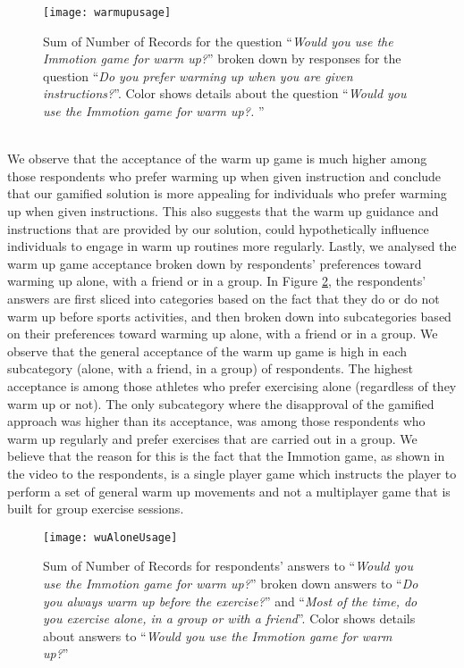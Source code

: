 \begin{figure}[h]
    \centering
    \texttt{[image: warmupusage]}
    \caption{Sum of Number of Records for the question ``\textit{Would you use the Immotion game for warm up?}'' broken down by responses for the question ``\textit{Do you prefer warming up when you are given instructions?}''. Color shows details about the question ``\textit{Would you use the Immotion game for warm up?. }''}
    \label{fig:warmupusage}
\end{figure}\\
We observe that the acceptance of the warm up game is much higher among those respondents who prefer warming up when given instruction and conclude that our gamified solution is more appealing for individuals who prefer warming up when given instructions. This also suggests that the warm up guidance and instructions that are provided by our solution, could hypothetically influence individuals to engage in warm up routines more regularly. Lastly, we analysed the warm up game acceptance broken down by respondents' preferences toward warming up alone, with a friend or in a group. In Figure \ref{fig:wuAloneUsage}, the respondents' answers are first sliced into categories based on the fact that they do or do not warm up before sports activities, and then broken down into subcategories based on their preferences toward warming up alone, with a friend or in a group. We observe that the general acceptance of the warm up game is high in each subcategory (alone, with a friend, in a group) of respondents. The highest acceptance is among those athletes who prefer exercising alone (regardless of they warm up or not). The only subcategory where the disapproval of the gamified approach was higher than its acceptance, was among those respondents who warm up regularly and prefer exercises that are carried out in a group. We believe that the reason for this is the fact that the Immotion game, as shown in the video to the respondents, is a single player game which instructs the player to perform a set of general warm up movements and not a multiplayer game that is built for group exercise sessions. 
\begin{figure}[h]
    \centering
    \texttt{[image: wuAloneUsage]}
    \caption{Sum of Number of Records for respondents' answers to ``\textit{Would you use the Immotion game for warm up?}'' broken down answers to ``\textit{Do you always warm up before the exercise?}'' and ``\textit{Most of the time, do you exercise alone, in a group or with a friend}''. Color shows details about answers to ``\textit{Would you use the Immotion game for warm up?}''}
    \label{fig:wuAloneUsage}
\end{figure}\\
